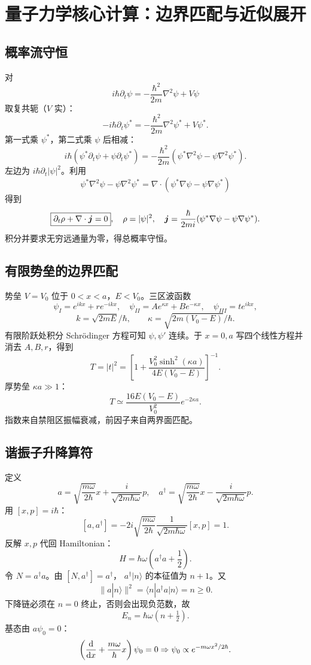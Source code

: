 \chapter{量子力学核心计算：边界匹配与近似展开}

\section{概率流守恒}
对
\[
i\hbar\partial_t\psi=
-\frac{\hbar^2}{2m}\nabla^2\psi+V\psi
\]
取复共轭（$V$ 实）：
\[
-i\hbar\partial_t\psi^*
=-\frac{\hbar^2}{2m}\nabla^2\psi^*+V\psi^*.
\]
第一式乘 $\psi^*$，第二式乘 $\psi$ 后相减：
\[
i\hbar(\psi^*\partial_t\psi+\psi\partial_t\psi^*)
=-\frac{\hbar^2}{2m}
(\psi^*\nabla^2\psi-\psi\nabla^2\psi^*).
\]
左边为 $i\hbar\partial_t|\psi|^2$。利用
\[
\psi^*\nabla^2\psi-\psi\nabla^2\psi^*
=\nabla\cdot(\psi^*\nabla\psi-\psi\nabla\psi^*)
\]
得到
\[
\boxed{\partial_t\rho+\nabla\cdot\bm{j}=0},
\quad
\rho=|\psi|^2,\quad
\bm{j}=\frac{\hbar}{2mi}
(\psi^*\nabla\psi-\psi\nabla\psi^*).
\]
积分并要求无穷远通量为零，得总概率守恒。

\section{有限势垒的边界匹配}
势垒 $V=V_0$ 位于 $0<x<a$，$E<V_0$。三区波函数
\[
\psi_I=e^{ikx}+re^{-ikx},\quad
\psi_{II}=Ae^{\kappa x}+Be^{-\kappa x},\quad
\psi_{III}=te^{ikx},
\]
\[
k=\sqrt{2mE}/\hbar,\qquad
\kappa=\sqrt{2m(V_0-E)}/\hbar.
\]
有限阶跃处积分 Schrödinger 方程可知 $\psi,\psi'$ 连续。于
$x=0,a$ 写四个线性方程并消去 $A,B,r$，得到
\[
\boxed{
T=|t|^2=
\left[1+\frac{V_0^2\sinh^2(\kappa a)}
{4E(V_0-E)}\right]^{-1}}.
\]
厚势垒 $\kappa a\gg1$：
\[
T\simeq
\frac{16E(V_0-E)}{V_0^2}e^{-2\kappa a}.
\]
指数来自禁阻区振幅衰减，前因子来自两界面匹配。

\section{谐振子升降算符}
定义
\[
a=\sqrt{\frac{m\omega}{2\hbar}}x+
\frac{i}{\sqrt{2m\hbar\omega}}p,
\quad
a^\dagger=\sqrt{\frac{m\omega}{2\hbar}}x-
\frac{i}{\sqrt{2m\hbar\omega}}p.
\]
用 $[x,p]=i\hbar$：
\[
[a,a^\dagger]
=-2i\sqrt{\frac{m\omega}{2\hbar}}
\frac1{\sqrt{2m\hbar\omega}}[x,p]=1.
\]
反解 $x,p$ 代回 Hamiltonian：
\[
H=\hbar\omega\left(a^\dagger a+\frac12\right).
\]
令 $N=a^\dagger a$。由
$[N,a^\dagger]=a^\dagger$，
$a^\dagger|n\rangle$ 的本征值为 $n+1$。又
\[
\|a|n\rangle\|^2
=\langle n|a^\dagger a|n\rangle=n\ge0.
\]
下降链必须在 $n=0$ 终止，否则会出现负范数，故
\[
E_n=\hbar\omega(n+\tfrac12).
\]
基态由 $a\psi_0=0$：
\[
\left(\frac{\mathrm d }{\mathrm d x}+\frac{m\omega}{\hbar}x\right)\psi_0=0
\Rightarrow
\psi_0\propto e^{-m\omega x^2/2\hbar}.
\]


